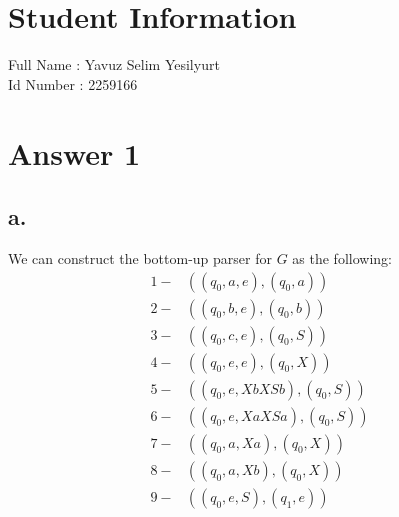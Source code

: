 \documentclass[12pt]{article}
\begin{document}
\section*{Student Information } 
Full Name : Yavuz Selim Yesilyurt \\
Id Number : 2259166 \\

\section*{Answer 1}

\subsection*{a.}
We can construct the bottom-up parser for $G$ as the following: \\

\begin{align*}
1-&((q_0,a,e),(q_0,a)) \\
2-&((q_0,b,e),(q_0,b)) \\
3-&((q_0,c,e),(q_0,S)) \\
4-&((q_0,e,e),(q_0,X)) \\
5-&((q_0,e,XbXSb),(q_0,S)) \\
6-&((q_0,e,XaXSa),(q_0,S)) \\
7-&((q_0,a,Xa),(q_0,X)) \\
8-&((q_0,a,Xb),(q_0,X)) \\
9-&((q_0,e,S),(q_1,e)) 
\end{align*} 
\end{document}
